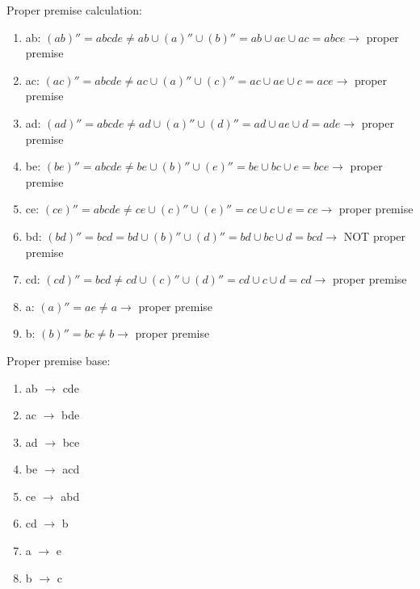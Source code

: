 Proper premise calculation:
\begin{enumerate}
\item ab: $(ab)'' = abcde \neq ab \cup (a)'' \cup (b)'' = ab \cup ae \cup ac = abce \rightarrow$ proper premise

\item ac: $(ac)'' = abcde \neq ac \cup (a)'' \cup (c)'' = ac \cup ae \cup c = ace \rightarrow$ proper premise

\item ad: $(ad)'' = abcde \neq ad \cup (a)'' \cup (d)'' = ad \cup ae \cup d = ade \rightarrow$ proper premise

\item be: $(be)'' = abcde \neq be \cup (b)'' \cup (e)'' = be \cup bc \cup e = bce \rightarrow$ proper premise

\item ce: $(ce)'' = abcde \neq ce \cup (c)'' \cup (e)'' = ce \cup c \cup e = ce \rightarrow$ proper premise

\item bd: $(bd)'' = bcd = bd \cup (b)'' \cup (d)'' = bd \cup bc \cup d = bcd \rightarrow$ NOT proper premise

\item cd: $(cd)'' = bcd \neq cd \cup (c)'' \cup (d)'' = cd \cup c \cup d = cd \rightarrow$ proper premise

\item a: $(a)'' = ae \neq a \rightarrow$ proper premise

\item b: $(b)'' = bc \neq b \rightarrow$ proper premise

\end{enumerate}

Proper premise base:
\begin{enumerate}

\item ab $\rightarrow$ cde
\item ac $\rightarrow$ bde
\item ad $\rightarrow$ bce
\item be $\rightarrow$ acd
\item ce $\rightarrow$ abd
\item cd $\rightarrow$ b
\item  a $\rightarrow$ e
\item  b $\rightarrow$ c
\end{enumerate}

